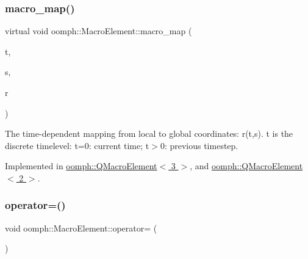 \mbox{\label{classoomph_1_1MacroElement_a819b095e97c92e634d6216ddce00c8a2}} 
\subsubsection{\texorpdfstring{macro\+\_\+map()}{macro\_map()}\hspace{0.1cm}{\footnotesize\ttfamily [2/2]}}
{\footnotesize\ttfamily virtual void oomph\+::\+Macro\+Element\+::macro\+\_\+map (\begin{DoxyParamCaption}\item[{const unsigned \&}]{t,  }\item[{const \hyperlink{classoomph_1_1Vector}{Vector}$<$ double $>$ \&}]{s,  }\item[{\hyperlink{classoomph_1_1Vector}{Vector}$<$ double $>$ \&}]{r }\end{DoxyParamCaption})\hspace{0.3cm}{\ttfamily [pure virtual]}}



The time-\/dependent mapping from local to global coordinates\+: r(t,s). t is the discrete timelevel\+: t=0\+: current time; t$>$0\+: previous timestep. 



Implemented in \hyperlink{classoomph_1_1QMacroElement_3_013_01_4_ae99513e135616e45927307ccfa0f8306}{oomph\+::\+Q\+Macro\+Element$<$ 3 $>$}, and \hyperlink{classoomph_1_1QMacroElement_3_012_01_4_af78c96d14b561af4ee3b1bf6c5331766}{oomph\+::\+Q\+Macro\+Element$<$ 2 $>$}.

\mbox{\label{classoomph_1_1MacroElement_a67d5e94fd6dc84aa2fad1b78178a362f}} 
\subsubsection{\texorpdfstring{operator=()}{operator=()}}
{\footnotesize\ttfamily void oomph\+::\+Macro\+Element\+::operator= (\begin{DoxyParamCaption}\item[{const \hyperlink{classoomph_1_1MacroElement}{Macro\+Element} \&}]{ }\end{DoxyParamCaption})\hspace{0.3cm}{\ttfamily [inline]}}



